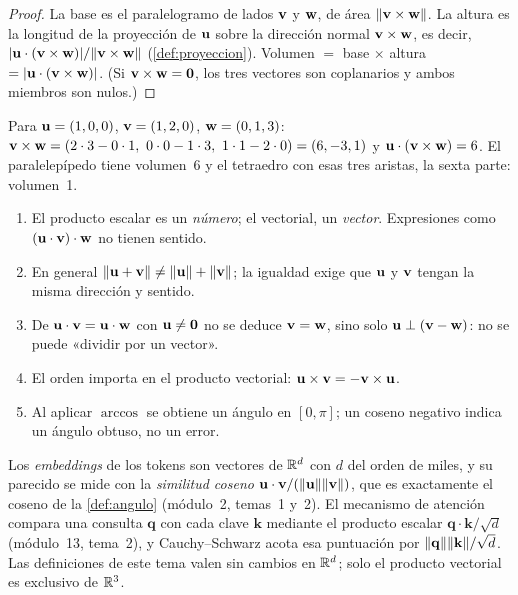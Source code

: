 \begin{proof}
La base es el paralelogramo de lados $\mathbf{v}$ y $\mathbf{w}$, de área $\lVert\mathbf{v}\times\mathbf{w}\rVert$. La altura es la longitud de la proyección de $\mathbf{u}$ sobre la dirección normal $\mathbf{v}\times\mathbf{w}$, es decir, $\lvert\mathbf{u}\cdot(\mathbf{v}\times\mathbf{w})\rvert/\lVert\mathbf{v}\times\mathbf{w}\rVert$ (\cref{def:proyeccion}). Volumen $=$ base $\times$ altura $=\lvert\mathbf{u}\cdot(\mathbf{v}\times\mathbf{w})\rvert$. (Si $\mathbf{v}\times\mathbf{w}=\mathbf{0}$, los tres vectores son coplanarios y ambos miembros son nulos.)
\end{proof}

\begin{ejemplo}\label{ej:t1-volumen}
Para $\mathbf{u}=(1,0,0)$, $\mathbf{v}=(1,2,0)$, $\mathbf{w}=(0,1,3)$: $\vv\times\vw=(2\cdot3-0\cdot1,\ 0\cdot0-1\cdot3,\ 1\cdot1-2\cdot0)=(6,-3,1)$ y $\mathbf{u}\cdot(\mathbf{v}\times\mathbf{w})=6$. El paralelepípedo tiene volumen~6 y el tetraedro con esas tres aristas, la sexta parte: volumen~1.
\end{ejemplo}

\begin{observacion}
\begin{enumerate}[label=(\alph*)]
\item El producto escalar es un \emph{número}; el vectorial, un \emph{vector}. Expresiones como $(\mathbf{u}\cdot\mathbf{v})\cdot\mathbf{w}$ no tienen sentido.
\item En general $\lVert\mathbf{u}+\mathbf{v}\rVert\neq\lVert\mathbf{u}\rVert+\lVert\mathbf{v}\rVert$; la igualdad exige que $\mathbf{u}$ y $\mathbf{v}$ tengan la misma dirección y sentido.
\item De $\mathbf{u}\cdot\mathbf{v}=\mathbf{u}\cdot\mathbf{w}$ con $\mathbf{u}\neq\mathbf{0}$ no se deduce $\mathbf{v}=\mathbf{w}$, sino solo $\mathbf{u}\perp(\mathbf{v}-\mathbf{w})$: no se puede «dividir por un vector».
\item El orden importa en el producto vectorial: $\mathbf{u}\times\mathbf{v}=-\mathbf{v}\times\mathbf{u}$.
\item Al aplicar $\arccos$ se obtiene un ángulo en $[0,\pi]$; un coseno negativo indica un ángulo obtuso, no un error.
\end{enumerate}
\end{observacion}

\begin{observacion}
Los \emph{embeddings} de los tokens son vectores de $\mathbb{R}^d$ con $d$ del orden de miles, y su parecido se mide con la \emph{similitud coseno} $\mathbf{u}\cdot\mathbf{v}/(\lVert\mathbf{u}\rVert\lVert\mathbf{v}\rVert)$, que es exactamente el coseno de la \cref{def:angulo} (módulo~2, temas~1 y~2). El mecanismo de atención compara una consulta $\mathbf{q}$ con cada clave $\mathbf{k}$ mediante el producto escalar $\mathbf{q}\cdot\mathbf{k}/\sqrt d$ (módulo~13, tema~2), y Cauchy--Schwarz acota esa puntuación por $\lVert\mathbf{q}\rVert\lVert\mathbf{k}\rVert/\sqrt d$. Las definiciones de este tema valen sin cambios en $\mathbb{R}^d$; solo el producto vectorial es exclusivo de $\mathbb{R}^3$.
\end{observacion}

